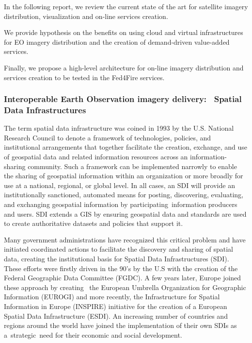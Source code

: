 \documentclass[a4paper]{article}
\begin{document}
In the following report, we review the current state of the art for
satellite imagery distribution, visualization and on-line services
creation.

We provide hypothesis on the benefits on using cloud and virtual
infrastructures for EO imagery distribution and the creation of
demand-driven value-added services.

Finally, we propose a high-level architecture for on-line imagery
distribution and services creation to be tested in the Fed4Fire
services.

\subsubsection[Interoperable Earth Observation imagery delivery:
\ Spatial Data Infrastructures]{Interoperable Earth Observation imagery
delivery: \ Spatial Data Infrastructures}
\hypertarget{Toc381777203}{}The term spatial data infrastructure was
coined in 1993 by the U.S. National Research Council to denote a
framework of technologies, policies, and institutional arrangements
that together facilitate the creation, exchange, and use of geospatial
data and related information resources across an information-sharing
community. Such a framework can be implemented narrowly to enable the
sharing of geospatial information within an organization or more
broadly for use at a national, regional, or global level. In all cases,
an SDI will provide an institutionally sanctioned, automated means for
posting, discovering, evaluating, and exchanging geospatial information
by participating\ information producers and users. SDI extends a GIS by
ensuring geospatial data and standards are used to create authoritative
datasets and policies that support it.

Many government administrations have recognized this critical problem
and have initiated coordinated actions to facilitate the discovery and
sharing of spatial data, creating the institutional basis for Spatial
Data Infrastructures (SDI). These efforts were firstly driven in the
90{\textquoteright}s by the U.S with the creation of the Federal
Geographic Data Committee (FGDC). A few years later, Europe joined
these approach by creating ~the European Umbrella Organization for
Geographic Information (EUROGI) and more recently, the Infrastructure
for Spatial Information in Europe (INSPIRE) initiative for the creation
of a European Spatial Data Infrastructure (ESDI). An increasing number
of countries and regions around the world have joined the
implementation of their own SDIs as a\ strategic\ need for their
economic and social development.\ 
\end{document}
